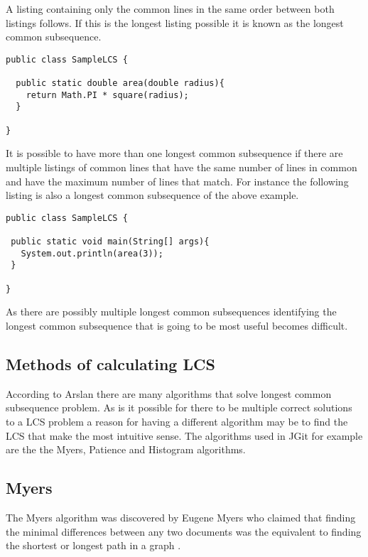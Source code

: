 A listing containing only the common lines in the same order between both listings follows.  If this is the longest listing possible it is known as the longest common subsequence.  

\begin{lstlisting}
public class SampleLCS { 

  public static double area(double radius){
    return Math.PI * square(radius);
  }
  
}

\end{lstlisting}

It is possible to have more than one longest common subsequence if there are multiple listings of common lines that have the same number of lines in common and have the maximum number of lines that match.  For instance the following listing is also a longest common subsequence of the above example.

\begin{lstlisting}
public class SampleLCS {

 public static void main(String[] args){
   System.out.println(area(3));
 }
 
}
\end{lstlisting}

As there are possibly multiple longest common subsequences identifying the longest common subsequence that is going to be most useful becomes difficult.

\subsection{Methods of calculating LCS}
According to Arslan \cite{Arslan2010} there are many algorithms that solve longest common subsequence problem. As is it possible for there to be multiple correct solutions to a LCS problem a reason for having a different algorithm may be to find the LCS that make the most intuitive sense. The algorithms used in JGit for example are the the Myers, Patience and Histogram algorithms.

\subsection{Myers}
The Myers algorithm was discovered by Eugene Myers who claimed that finding the minimal differences between any two documents was the equivalent to finding the shortest or longest path in a graph \cite{Myers1986}.

